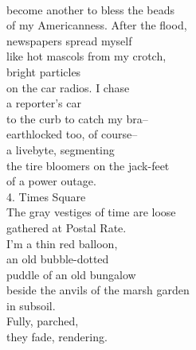 \documentclass[smalldemyvopaper,11pt,twoside,onecolumn,openright,extrafontsizes]{memoir}
\begin{document}
\\become another to bless the beads
\\of my Americanness. After the flood,
\\newspapers spread myself
\\like hot mascols from my crotch,
\\bright particles
\\on the car radios. I chase
\\a reporter's car
\\to the curb to catch my bra--
\\earthlocked too, of course--
\\a livebyte, segmenting
\\the tire bloomers on the jack-feet
\\of a power outage.
\\4. Times Square
\\The gray vestiges of time are loose
\\gathered at Postal Rate.
\\I'm a thin red balloon,
\\an old bubble-dotted
\\puddle of an old bungalow
\\beside the anvils of the marsh garden
\\in subsoil.
\\Fully, parched,
\\they fade, rendering.
\end{document}
